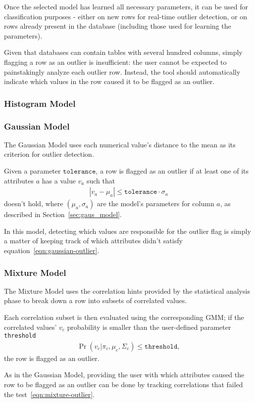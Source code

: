 Once the selected model has learned all necessary parameters, it can be used for classification purposes - either on new rows for real-time outlier detection, or on rows already present in the database (including those used for learning the parameters).

Given that databases can contain tables with several hundred columns, simply flagging a row as an outlier is insufficient: the user cannot be expected to painstakingly analyze each outlier row. Instead, the tool should automatically indicate which values in the row caused it to be flagged as an outlier.

\subsubsection{Histogram Model}
\subsubsection{Gaussian Model}
The Gaussian Model uses each numerical value's distance to the mean as its criterion for outlier detection. 

Given a parameter $\texttt{tolerance}$, a row is flagged as an outlier if at least one of its attributes $a$ has a value $v_a$ such that 
\begin{align}
|v_a - \mu_a| \leq \texttt{tolerance} \cdot \sigma_a
\label{eqn:gaussian-outlier}
\end{align}
doesn't hold, where $(\mu_a, \sigma_a)$ are the model's parameters for column $a$, as described in Section~\ref{sec:gaus_model}.

In this model, detecting which values are responsible for the outlier flag is simply a matter of keeping track of which attributes didn't satisfy equation~\ref{eqn:gaussian-outlier}.
 
\subsubsection{Mixture Model}
The Mixture Model uses the correlation hints provided by the statistical analysis phase to break down a row into subsets of correlated values.

Each correlation subset is then evaluated using the corresponding GMM; if the correlated values' $v_c$ probability is smaller than the user-defined parameter \texttt{threshold}
\begin{align}
\Pr(v_c | \pi_c, \mu_c, \Sigma_c) \leq \texttt{threshold}, 
\label{eqn:mixture-outlier}
\end{align}
the row is flagged as an outlier.

As in the Gaussian Model, providing the user with which attributes caused the row to be flagged as an outlier can be done by tracking correlations that failed the test~\ref{eqn:mixture-outlier}.
